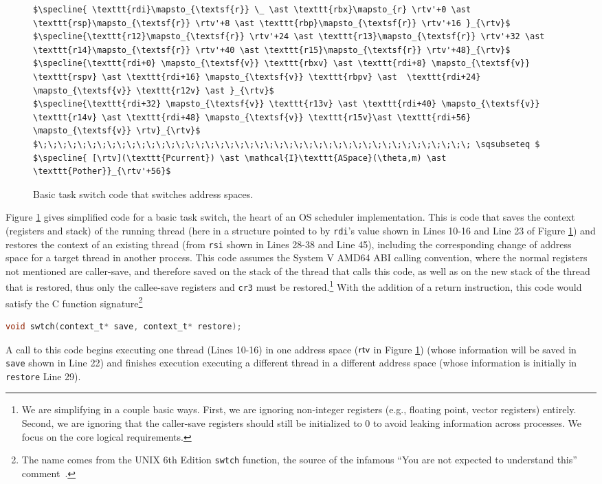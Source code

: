 \documentclass[acmsmall,screen,nonacm]{acmart}
\begin{document}
\begin{figure}
\begin{lstlisting}
$\specline{ \texttt{rdi}\mapsto_{\textsf{r}} \_ \ast \texttt{rbx}\mapsto_{r} \rtv'+0 \ast  \texttt{rsp}\mapsto_{\textsf{r}} \rtv'+8 \ast \texttt{rbp}\mapsto_{\textsf{r}} \rtv'+16 }_{\rtv}$
$\specline{\texttt{r12}\mapsto_{\textsf{r}} \rtv'+24 \ast \texttt{r13}\mapsto_{\textsf{r}} \rtv'+32 \ast \texttt{r14}\mapsto_{\textsf{r}} \rtv'+40 \ast \texttt{r15}\mapsto_{\textsf{r}} \rtv'+48}_{\rtv}$
$\specline{\texttt{rdi+0} \mapsto_{\textsf{v}} \texttt{rbxv} \ast \texttt{rdi+8} \mapsto_{\textsf{v}} \texttt{rspv} \ast \texttt{rdi+16} \mapsto_{\textsf{v}} \texttt{rbpv} \ast  \texttt{rdi+24} \mapsto_{\textsf{v}} \texttt{r12v} \ast }_{\rtv}$
$\specline{\texttt{rdi+32} \mapsto_{\textsf{v}} \texttt{r13v} \ast \texttt{rdi+40} \mapsto_{\textsf{v}} \texttt{r14v} \ast \texttt{rdi+48} \mapsto_{\textsf{v}} \texttt{r15v}\ast \texttt{rdi+56} \mapsto_{\textsf{v}} \rtv}_{\rtv}$
$\;\;\;\;\;\;\;\;\;\;\;\;\;\;\;\;\;\;\;\;\;\;\;\;\;\;\;\;\;\;\;\;\;\;\;\;\;\;\;\;\;\;\;\; \sqsubseteq $
$\specline{ [\rtv](\texttt{Pcurrent}) \ast \mathcal{I}\texttt{ASpace}(\theta,m) \ast \texttt{Pother}}_{\rtv'+56}$
\end{lstlisting}
\caption{Basic task switch code that switches address spaces.}
\label{fig:swtch}
\end{figure}

Figure \ref{fig:swtch} gives simplified code for a basic task switch, the heart of an OS scheduler implementation. This is code that saves the context (registers and stack) of the running thread (here in a structure pointed to by \lstinline|rdi|'s value shown in Lines 10-16 and Line 23 of Figure \ref{fig:swtch}) and restores the context of an existing thread (from \lstinline|rsi| shown in Lines 28-38 and Line 45), including the corresponding change of address space for a target thread in another process.
This code assumes the System V AMD64 ABI calling convention, where the normal registers not mentioned are caller-save, and therefore saved on the stack of the thread that calls this code, as well as on the new stack of the thread that is restored, thus only the callee-save registers and \texttt{cr3} must be restored.\footnote{We are simplifying in a couple basic ways. First, we are ignoring non-integer registers (e.g., floating point, vector registers) entirely. Second, we are ignoring that the caller-save registers should still be initialized to 0 to avoid leaking information across processes. We focus on the core logical requirements.}
With the addition of a return instruction, this code would satisfy the C function signature\footnote{The name comes from the UNIX 6th Edition \lstinline|swtch| function, the source of the infamous ``You are not expected to understand this'' comment~\cite{lions1996lions}.}
\begin{lstlisting}[language=C]
void swtch(context_t* save, context_t* restore);
\end{lstlisting}
A call to this code begins executing one thread (Lines 10-16) in one address space ($\textsf{rtv}$ in Figure \ref{fig:swtch}) (whose information will be saved in \lstinline[language=C]|save| shown in Line 22) and finishes execution executing a different thread in a different address space (whose information is initially in \lstinline[language=C]|restore| Line 29).
\end{document}
